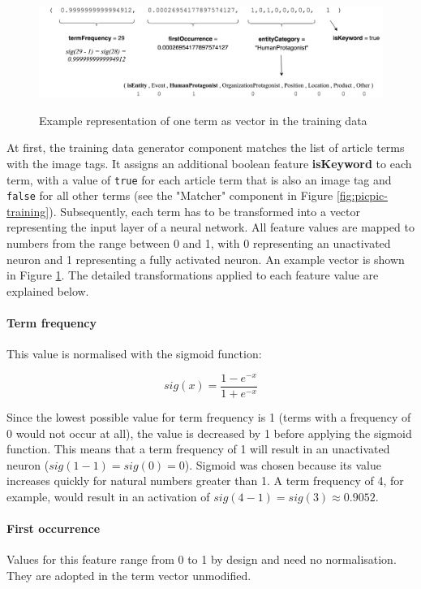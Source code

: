 \documentclass[11pt,a4paper,twoside]{article}
\begin{document}
\begin{figure}[h]
    \caption{Example representation of one term as vector in the training data}
    \centering
    \includegraphics[width=\columnwidth]{example-training-term.png}
    \label{fig:example-training-term}
\end{figure}

\noindent At first, the training data generator component matches the list of article terms with the image tags. It assigns an additional boolean feature \textbf{isKeyword} to each term, with a value of \lstinline{true} for each article term that is also an image tag and \lstinline{false} for all other terms (see the "Matcher" component in Figure \ref{fig:picpic-training}). Subsequently, each term has to be transformed into a vector representing the input layer of a neural network. All feature values are mapped to numbers from the range between 0 and 1, with 0 representing an unactivated neuron and 1 representing a fully activated neuron. An example vector is shown in Figure \ref{fig:example-training-term}. The detailed transformations applied to each feature value are explained below.

\paragraph{Term frequency} This value is normalised with the sigmoid function:

\[
sig(x) = \frac{1 - e^{-x}}{1 + e^{-x}}
\]

\noindent Since the lowest possible value for term frequency is 1 (terms with a frequency of 0 would not occur at all), the value is decreased by 1 before applying the sigmoid function. This means that a term frequency of 1 will result in an unactivated neuron ($sig(1-1) = sig(0) = 0$). Sigmoid was chosen because its value increases quickly for natural numbers greater than 1. A term frequency of 4, for example, would result in an activation of $sig(4-1) = sig(3) \approx 0.9052$.

\paragraph{First occurrence} Values for this feature range from 0 to 1 by design and need no normalisation. They are adopted in the term vector unmodified.
\end{document}
